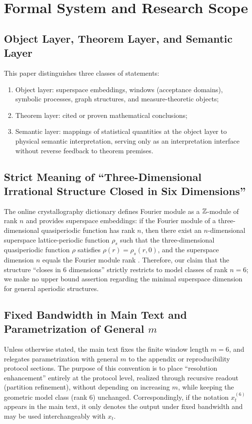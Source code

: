 \section{Formal System and Research Scope}

\subsection{Object Layer, Theorem Layer, and Semantic Layer}

This paper distinguishes three classes of statements:
\begin{enumerate}
  \item Object layer: superspace embeddings, windows (acceptance domains), symbolic processes, graph structures, and measure-theoretic objects;
  \item Theorem layer: cited or proven mathematical conclusions;
  \item Semantic layer: mappings of statistical quantities at the object layer to physical semantic interpretation, serving only as an interpretation interface without reverse feedback to theorem premises.
\end{enumerate}

\subsection{Strict Meaning of ``Three-Dimensional Irrational Structure Closed in Six Dimensions''}

The online crystallography dictionary defines Fourier module as a $\mathbb{Z}$-module of rank $n$ and provides superspace embeddings: if the Fourier module of a three-dimensional quasiperiodic function has rank $n$, then there exist an $n$-dimensional superspace lattice-periodic function $\rho_s$ such that the three-dimensional quasiperiodic function $\rho$ satisfies $\rho(r)=\rho_s(r,0)$, and the superspace dimension $n$ equals the Fourier module rank \cite{IUCRSuperspace}.
Therefore, our claim that the structure ``closes in $6$ dimensions'' strictly restricts to model classes of rank $n=6$; we make no upper bound assertion regarding the minimal superspace dimension for general aperiodic structures.

\subsection{Fixed Bandwidth in Main Text and Parametrization of General $m$}
Unless otherwise stated, the main text fixes the finite window length $m=6$, and relegates parametrization with general $m$ to the appendix or reproducibility protocol sections. The purpose of this convention is to place ``resolution enhancement'' entirely at the protocol level, realized through recursive readout (partition refinement), without depending on increasing $m$, while keeping the geometric model class (rank $6$) unchanged.
Correspondingly, if the notation $x_t^{(6)}$ appears in the main text, it only denotes the output under fixed bandwidth and may be used interchangeably with $x_t$.
